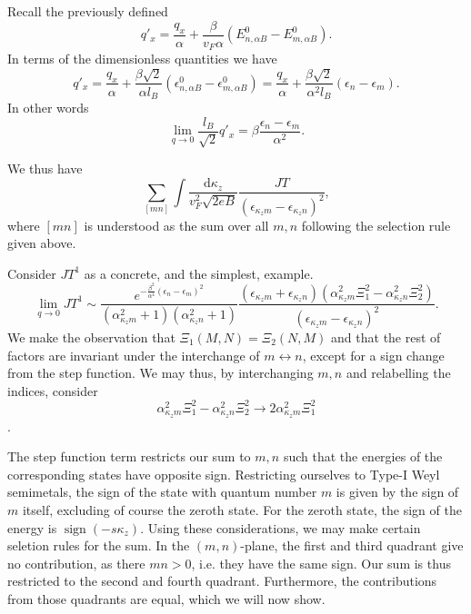 Recall the previously defined
\[
  q' _x = \frac{q_x}{\alpha } + \frac{\beta}{v_{F} \alpha }( E^0_{n,\alpha B} - E^0_{m, \alpha B} ).
\]
In terms of the dimensionless quantities we have
\begin{equation}
  \label{eq:qprimelimit}
  q' _x = \frac{q_x}{\alpha } + \frac{\beta \sqrt{2} }{\alpha l_B }( \epsilon ^0_{n,\alpha B} - \epsilon ^0_{m, \alpha B} )
  = \frac{q_x}{\alpha } + \frac{\beta \sqrt{2} }{\alpha^2 l_{B} }( \epsilon_n - \epsilon_m ).
\end{equation}
In other words
\[
\lim_{q\to 0} \frac{l_B}{\sqrt{2} } q'_x = \beta \frac{\epsilon_n-\epsilon_m}{\alpha ^2}.
\]

We thus have
\begin{equation}
  \label{eq:62}
  \sum\limits_{[mn]}^{}
  \int  \frac{\mathrm{d} \kappa _z}{v_F^2 \sqrt{2 eB}}
  \frac{
    J T
  }{
    (\epsilon_{\kappa _z m} - \epsilon_{\kappa _z n})^2
  },
\end{equation}
where \( [mn] \) is understood as the sum over all \( m,n \) following the selection rule given above.

Consider \( J T^1 \) as a concrete, and the simplest, example.
\begin{equation}
  \label{eq:63}
  \lim_{q\to 0} J T^1 \sim \frac{e^{- \frac{\beta^2}{\alpha ^4} ( \epsilon _n - \epsilon _m )^2}}{
    (\alpha_{\kappa _{z} m}^2 + 1)(\alpha_{\kappa _{z} n}^2 + 1)
  }
  \frac{(\epsilon_{\kappa _z m} + \epsilon_{\kappa _z n}) ( \alpha _{\kappa _z m}^2 \Xi _1^2 - \alpha _{\kappa _z n}^2 \Xi _2^2 )}{
(\epsilon_{\kappa _{z} m} - \epsilon_{\kappa _{z} n}) ^2
  }.
\end{equation}
We make the observation that \( \Xi_{1}(M,N) = \Xi _2(N, M)  \) and that the rest of factors are invariant under the interchange of \( m \leftrightarrow n \), except for a sign change from the step function.
We may thus, by interchanging \( m,n \) and relabelling the indices, consider
\[
  \alpha _{\kappa _z m}^2 \Xi _1^2 - \alpha _{\kappa _z n}^2 \Xi _2^2 \to  2 \alpha _{\kappa _z m}^2 \Xi _1^2
\].

The step function term restricts our sum to \( m,n \) such that the energies of the corresponding states have opposite sign.
Restricting ourselves to Type-I Weyl semimetals, the sign of the state with quantum number \( m \) is given by the sign of \( m \) itself, excluding of course the zeroth state.
For the zeroth state, the sign of the energy is \( \operatorname{sign} (- s \kappa_z) \).
Using these considerations, we may make certain seletion rules for the sum.
In the \( (m,n) \)-plane, the first and third quadrant give no contribution, as there \( m n > 0 \), i.e. they have the same sign.
Our sum is thus restricted to the second and fourth quadrant.
Furthermore, the contributions from those quadrants are equal, which we will now show.

